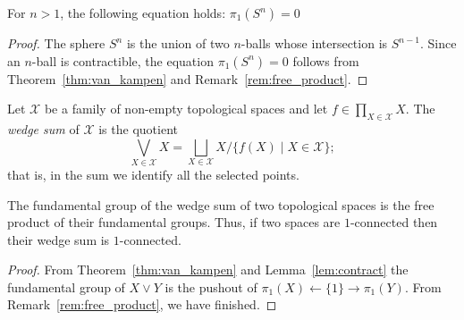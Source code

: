 \documentclass{standalone}
\begin{document}
	\begin{theorem}\label{thm:pi_1_spheres}
		For $n>1$, the following equation holds: $\pi_{1}(S^{n})=0$
	\end{theorem}
	
	\begin{proof}
		The sphere $S^{n}$ is the union of two $n$-balls whose intersection is $S^{n-1}$. Since an $n$-ball is contractible, the equation $\pi_{1}(S^{n})=0$ follows from Theorem~\ref{thm:van_kampen} and Remark~\ref{rem:free_product}.
	\end{proof}
	
	\begin{definition}\label{defn:wedge}
		Let $\mathcal{X}$ be a family of non-empty topological spaces and let $f\in\prod_{X\in\mathcal{X}}X$. The \emph{wedge sum}  of $\mathcal{X}$ is the quotient \[\bigvee_{X\in\mathcal{X}}X=\bigsqcup_{X\in\mathcal{X}}X/\{f(X)\mid X\in\mathcal{X}\};\] that is, in the sum we identify all the selected points.
	\end{definition}
	
	
	\begin{proposition}\label{prop:wedge_homotopy}
		The fundamental group of the wedge sum of two topological spaces is the free product of their fundamental groups. Thus, if two spaces are $1$-connected then their wedge sum is $1$-connected.
	\end{proposition}
	
	\begin{proof}
		From Theorem~\ref{thm:van_kampen} and Lemma~\ref{lem:contract} the fundamental group of $X\vee Y$ is the pushout of $\pi_{1}(X)\leftarrow \{1\}\rightarrow \pi_{1}(Y)$. From Remark~\ref{rem:free_product}, we have finished.
	\end{proof}
	
\end{document}
